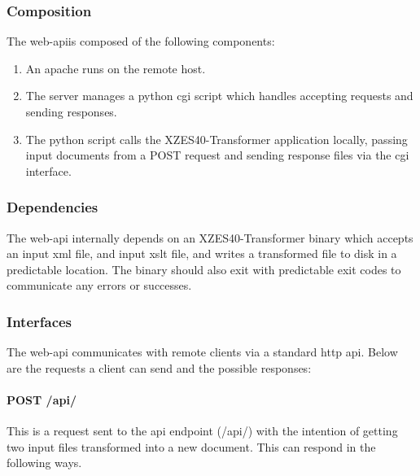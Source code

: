 \begin{enmerate}
\begin{itemzie}
\subsubsection{Composition}

The \gls{web-api}is composed of the following components:

\begin{enumerate}
  \item  An \gls{apache} runs on the remote host.\cite{apache-server}
  \item The server manages a \gls{python} \gls{cgi} script which handles accepting requests and sending responses.
  \item The \gls{python} script calls the XZES40-Transformer application locally, passing input documents from a POST request and sending response files via the \gls{cgi} interface.
\end{enumerate}

\subsubsection{Dependencies}

The \gls{web-api} internally depends on an XZES40-Transformer binary which accepts an input \gls{xml} file, and input \gls{xslt} file, and writes a transformed file to disk in a predictable location.
The binary should also exit with predictable exit codes to communicate any errors or successes.

\subsubsection{Interfaces}

The \gls{web-api} communicates with remote clients via a standard \gls{http} \gls{api}.
Below are the requests a client can send and the possible responses:

\paragraph{POST /api/}

This is a request sent to the \gls{api} endpoint (/api/) with the intention of getting two input files transformed into a new document.
This can respond in the following ways.


\end{itemzie}
\end{enmerate}
